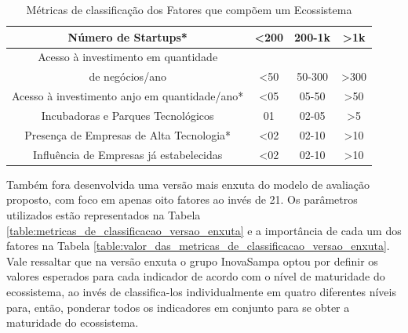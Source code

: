 \begin{table}
\begin{tabular}{ | c | c | c | c |}
\hline
Número de Startups*                                        &    <200    &   200-1k   &    >1k      \\
\hline
Acesso à investimento em quantidade \\de negócios/ano      &    <50     &   50-300   &    >300     \\
\hline
Acesso à investimento anjo em quantidade/ano*              &    <05     &   05-50    &    >50      \\
\hline
Incubadoras e Parques Tecnológicos                         &     01     &    02-05   &    >5       \\
\hline
Presença de Empresas de Alta Tecnologia*                   &    <02     &   02-10    &    >10      \\
\hline
Influência de Empresas já estabelecidas                    &    <02     &   02-10    &    >10      \\
\hline
\end{tabular}

\caption{Métricas de classificação dos Fatores que compõem um Ecossistema}
\label{table:metricas_de_classificacao_dos_fatores}
\end{table}

Também fora desenvolvida uma versão mais enxuta do modelo de avaliação proposto, com foco em apenas oito fatores ao invés de 21. Os parâmetros utilizados estão representados na Tabela \ref{table:metricas_de_classificacao_versao_enxuta} e a importância de cada um dos fatores na Tabela \ref{table:valor_das_metricas_de_classificacao_versao_enxuta}. Vale ressaltar que na versão enxuta o grupo InovaSampa optou por definir os valores esperados para cada indicador de acordo com o nível de maturidade do ecossistema, ao invés de classifica-los individualmente em quatro diferentes níveis para, então, ponderar todos os indicadores em conjunto para se obter a maturidade do ecossistema.

